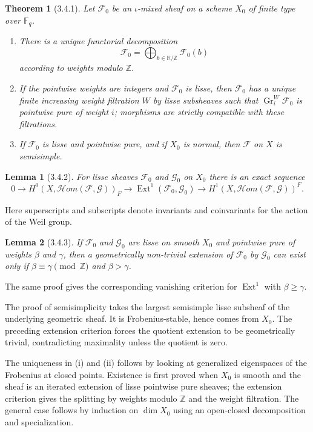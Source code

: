 \documentclass[11pt]{article}
\newtheorem{theorem}{Theorem}
\newtheorem{lemma}{Lemma}
\theoremstyle{remark}
\newcommand{\ZZ}{\mathbb{Z}}
\newcommand{\RR}{\mathbb{R}}
\newcommand{\Fq}{\mathbb{F}_q}
\begin{document}
\begin{theorem}[3.4.1]
Let $\mathcal F_0$ be an $\iota$-mixed sheaf on a scheme $X_0$ of finite type over $\Fq$.
\begin{enumerate}[label=(\roman*)]
\item There is a unique functorial decomposition
\[
\mathcal F_0=\bigoplus_{b\in\RR/\ZZ}\mathcal F_0(b)
\]
according to weights modulo $\mathbb Z$.
\item If the pointwise weights are integers and $\mathcal F_0$ is lisse, then $\mathcal F_0$ has a unique finite increasing weight filtration $W$ by lisse subsheaves such that $\operatorname{Gr}^W_i\mathcal F_0$ is pointwise pure of weight $i$; morphisms are strictly compatible with these filtrations.
\item If $\mathcal F_0$ is lisse and pointwise pure, and if $X_0$ is normal, then $\mathcal F$ on $X$ is semisimple.
\end{enumerate}
\end{theorem}

\begin{lemma}[3.4.2]
For lisse sheaves $\mathcal F_0$ and $\mathcal G_0$ on $X_0$ there is an exact sequence
\[
0\to H^0(X,\mathcal Hom(\mathcal F,\mathcal G))_F
\to \operatorname{Ext}^1(\mathcal F_0,\mathcal G_0)
\to H^1(X,\mathcal Hom(\mathcal F,\mathcal G))^F .
\]
\end{lemma}
Here superscripts and subscripts denote invariants and coinvariants for the action of the Weil group.

\begin{lemma}[3.4.3]
If $\mathcal F_0$ and $\mathcal G_0$ are lisse on smooth $X_0$ and pointwise pure of weights $\beta$ and $\gamma$, then a geometrically non-trivial extension of $\mathcal F_0$ by $\mathcal G_0$ can exist only if $\beta\equiv\gamma\pmod{\mathbb Z}$ and $\beta>\gamma$.
\end{lemma}
The same proof gives the corresponding vanishing criterion for $\operatorname{Ext}^1$ with $\beta\ge\gamma$.

The proof of semisimplicity takes the largest semisimple lisse subsheaf of the underlying geometric sheaf. It is Frobenius-stable, hence comes from $X_0$. The preceding extension criterion forces the quotient extension to be geometrically trivial, contradicting maximality unless the quotient is zero.

The uniqueness in (i) and (ii) follows by looking at generalized eigenspaces of the Frobenius at closed points. Existence is first proved when $X_0$ is smooth and the sheaf is an iterated extension of lisse pointwise pure sheaves; the extension criterion gives the splitting by weights modulo $\mathbb Z$ and the weight filtration. The general case follows by induction on $\dim X_0$ using an open-closed decomposition and specialization.
\end{document}
